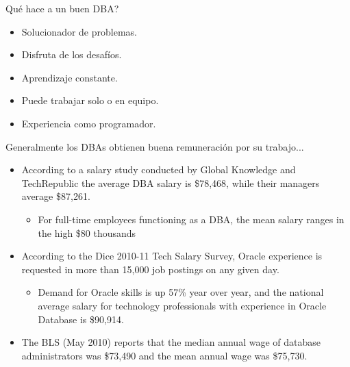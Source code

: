 \documentclass{beamer}
\begin{document}
\begin{frame}{Qué hace a un buen DBA?}
    \begin{itemize}
        \item Solucionador de problemas.
        \item Disfruta de los desafíos.
        \item Aprendizaje constante.
        \item Puede trabajar solo o en equipo.
        \item Experiencia como programador.
    \end{itemize}
\end{frame}

\begin{frame}{Generalmente los DBAs obtienen buena remuneración por su trabajo...}
    \begin{itemize}
        \item According to a salary study conducted by Global Knowledge and TechRepublic the average DBA salary is \$78,468, while their managers average \$87,261. 
        \begin{itemize}
            \item For full-time employees functioning as a DBA, the mean salary ranges in the high \$80 thousands
        \end{itemize}

        \item According to the Dice 2010-11 Tech Salary Survey, Oracle experience is requested in more than 15,000 job postings on any given day. 
        \begin{itemize}
            \item Demand for Oracle skills is up 57\% year over year, and the national average salary for technology professionals with experience in Oracle Database is \$90,914. 
        \end{itemize}

        \item The BLS (May 2010) reports that the median annual wage of database administrators was \$73,490 and the mean annual wage was \$75,730. 
    \end{itemize}
\end{frame}
\end{document}
